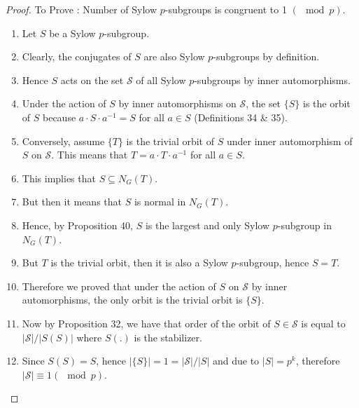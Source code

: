 \documentclass{article}
\theoremstyle{definition}
\theoremstyle{remark}
\theoremstyle{definition}
\theoremstyle{definition}
\theoremstyle{definition}
\theoremstyle{proof}
\newcommand{\inv}[1]{#1^{-1}}
\newcommand{\order}[1]{\left\vert #1 \right\vert}
\begin{document}
\begin{proof}
To Prove : Number of Sylow $ p $-subgroups is congruent to 1 $ (\mod p) $.
\begin{enumerate}
	\itemsep-0.3em
	\item{Let $ S $ be a Sylow $ p $-subgroup.}
	\item{Clearly, the conjugates of $ S $ are also Sylow $ p $-subgroups by definition.}
	\item{Hence $ S $ acts on the set $ \mathcal{S} $ of all Sylow $ p $-subgroups by inner automorphisms.}
	\item{Under the action of $ S $ by inner automorphisms on $ \mathcal{S} $, the set $ \{S\} $ is the orbit of $ S $ because $ a\cdot S\cdot \inv{a} = S $ for all $ a\in S $ (Definitions 34 \& 35).}
	\item{Conversely, assume $ \{T\} $ is the trivial orbit of $ S $ under inner automorphism of $ S $ on $ \mathcal{S} $. This means that $ T = a\cdot T\cdot \inv{a} $ for all $ a \in S$.}
	\item{This implies that $ S \subseteq N_G(T) $. }
	\item{But then it means that $ S $ is normal in $ N_G(T) $.}
	\item{Hence, by Proposition 40, $ S $ is the largest and only Sylow $ p $-subgroup in $ N_G(T) $.}
	\item{But $ T $ is the trivial orbit, then it is also a Sylow $ p $-subgroup, hence $ S=T $.}
	\item{Therefore we proved that under the action of $ S $ on $ \mathcal{S} $ by inner automorphisms, the only orbit is the trivial orbit is $ \{S\} $.}
	\item{Now by Proposition 32, we have that order of the orbit of $ S \in \mathcal{S}$ is equal to $ \order{\mathcal{S}}/ \order{S(S)} $ where $ S(.) $ is the stabilizer.}
	\item{Since $ S(S) = S$, hence $ \order{\{S\}} = 1 =\order{\mathcal{S}}/\order{S} $ and due to $ \order{S} = p^k $, therefore $ \order{\mathcal{S}} \equiv 1 (\mod p)$.}

\end{enumerate}
\end{proof}
\end{document}
